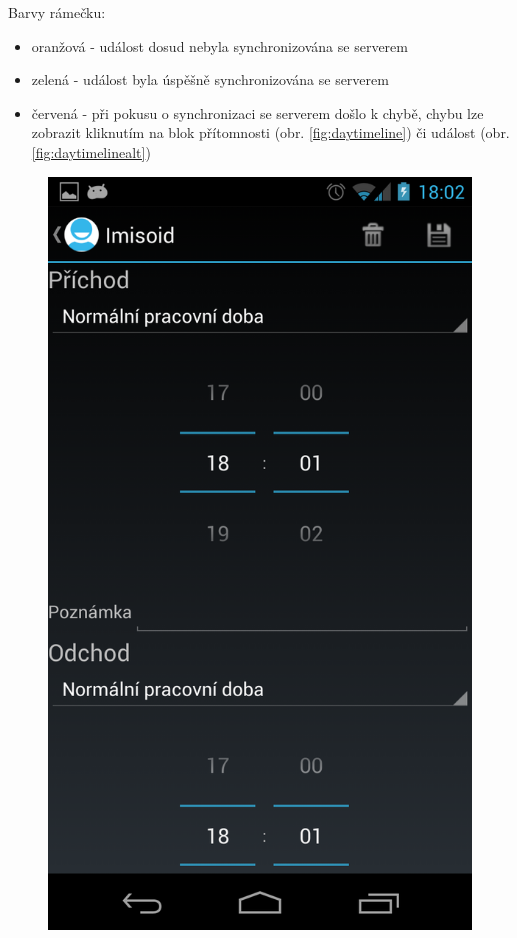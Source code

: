\documentclass{diplomka}
\begin{document}
\noindent
Barvy rámečku:
\begin{itemize}[noitemsep,nolistsep]
\item oranžová - událost dosud nebyla synchronizována se serverem
\item zelená - událost byla úspěšně synchronizována se serverem
\item červená - při pokusu o synchronizaci se serverem došlo k chybě, chybu lze zobrazit kliknutím na blok přítomnosti (obr. \ref{fig:daytimeline}) či událost (obr. \ref{fig:daytimelinealt})
\end{itemize}

\begin{figure}[H]
\centering
\begin{minipage}{.45\textwidth}
  \centering
  \includegraphics[width=.9\linewidth]{scr/edit.png}

\end{minipage}
\end{figure}
\end{document}
